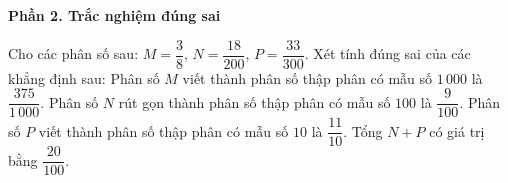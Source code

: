 \textbf{Phần 2. Trắc nghiệm đúng sai}

\begin{ex} %
Cho các phân số sau: $M = \dfrac{3}{8}$, $N = \dfrac{18}{200}$, $P = \dfrac{33}{300}$. Xét tính đúng sai của các khẳng định sau:
\choiceTF
{\True Phân số $M$ viết thành phân số thập phân có mẫu số $1\,000$ là $\dfrac{375}{1\,000}$.}
{\True Phân số $N$ rút gọn thành phân số thập phân có mẫu số $100$ là $\dfrac{9}{100}$.}
{Phân số $P$ viết thành phân số thập phân có mẫu số $10$ là $\dfrac{11}{10}$.}
{\True Tổng $N + P$ có giá trị bằng $\dfrac{20}{100}$.}
\end{ex}

